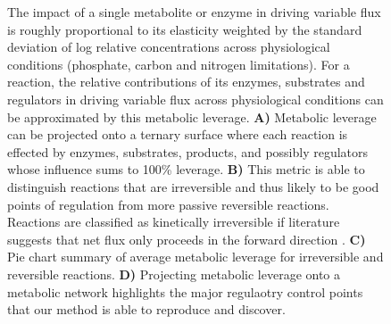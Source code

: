 \begin{figure}
\caption[Flux change in response to changing concentrations of metabolites and enzymes whose impact on flux is governed by the metabolites' and enzyme's elasticity.] {The impact of a single metabolite or enzyme in driving variable flux is roughly proportional to its elasticity weighted by the standard deviation of log relative concentrations across physiological conditions (phosphate, carbon and nitrogen limitations).  For a reaction, the relative contributions of its enzymes, substrates and regulators in driving variable flux across physiological conditions can be approximated by this metabolic leverage.  \textbf{A)} Metabolic leverage can be projected onto a ternary surface where each reaction is effected by enzymes, substrates, products, and possibly regulators whose influence sums to 100\% leverage.  \textbf{B)} This metric is able to distinguish reactions that are irreversible and thus likely to be good points of regulation from more passive reversible reactions. Reactions are classified as kinetically irreversible if literature suggests that net flux only proceeds in the forward direction \cite{Heavner:2012dg}. \textbf{C)} Pie chart summary of average metabolic leverage for irreversible and reversible reactions. \textbf{D)} Projecting metabolic leverage onto a metabolic network highlights the major regulaotry control points that our method is able to reproduce and discover.}
\end{figure}



